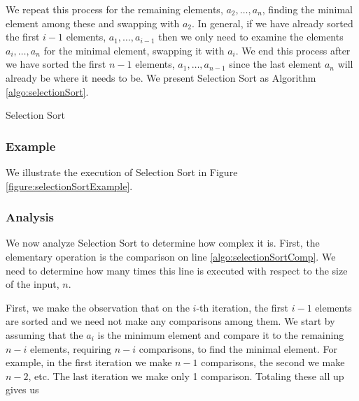 We repeat this process for the remaining elements, $a_2, \ldots, a_n$, 
finding the minimal element among these and swapping with $a_2$.  In 
general, if we have already sorted the first $i-1$ elements, 
$a_1, \ldots, a_{i-1}$ then we only need to examine the elements
$a_i, \ldots, a_n$ for the minimal element, swapping it with $a_i$.
We end this process after we have sorted the first $n-1$ elements, 
$a_1, \ldots, a_{n-1}$ since the last element $a_n$ will already
be where it needs to be.  We present Selection Sort as Algorithm 
\ref{algo:selectionSort}.

    \begin{algorithm}[H]
    \caption{Selection Sort}
    \label{algo:selectionSort}
    \end{algorithm}

\subsubsection{Example}

We illustrate the execution of Selection Sort in Figure
\ref{figure:selectionSortExample}. 



\subsubsection{Analysis}

We now analyze Selection Sort to determine how complex it is.  First, the
elementary operation is the comparison on line \ref{algo:selectionSortComp}.
We need to determine how many times this line is executed with respect
to the size of the input, $n$.

First, we make the observation that on the $i$-th iteration, the first
$i-1$ elements are sorted and we need not make any comparisons among
them.  We start by assuming that the $a_i$ is the minimum element and
compare it to the remaining $n-i$ elements, requiring $n-i$ comparisons,
to find the minimal element.  For example, in the first iteration we
make $n-1$ comparisons, the second we make $n-2$, etc.  The last
iteration we make only 1 comparison.  Totaling these all up gives us

